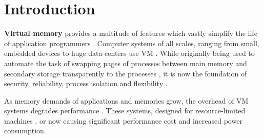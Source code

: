 \chapter{Introduction} %


















\textbf{Virtual memory} provides a multitude of features which vastly simplify the life of application programmers \cite{jacob1998virtualissues}. Computer systems of all scales, ranging from small, embedded devices to huge data centers use VM \cite{bhattacharjee2017architectural}.
While originally being used to automate the task of swapping pages of processes between main memory and secondary storage transparently to the processes \cite{jacob1998virtualissues}, it is now the foundation of security, reliability, process isolation and flexibility \cite{wales1999virtual,jacobVirtualMemoryContemporary1998}.

As memory demands of applications and memories grow, the overhead of VM systems degrades performance \cite{zagieboylo2020cost}. These systems, designed for resource-limited machines \cite{halbuer2023morsels}, or now causing significant performance cost and increased power consumption.

